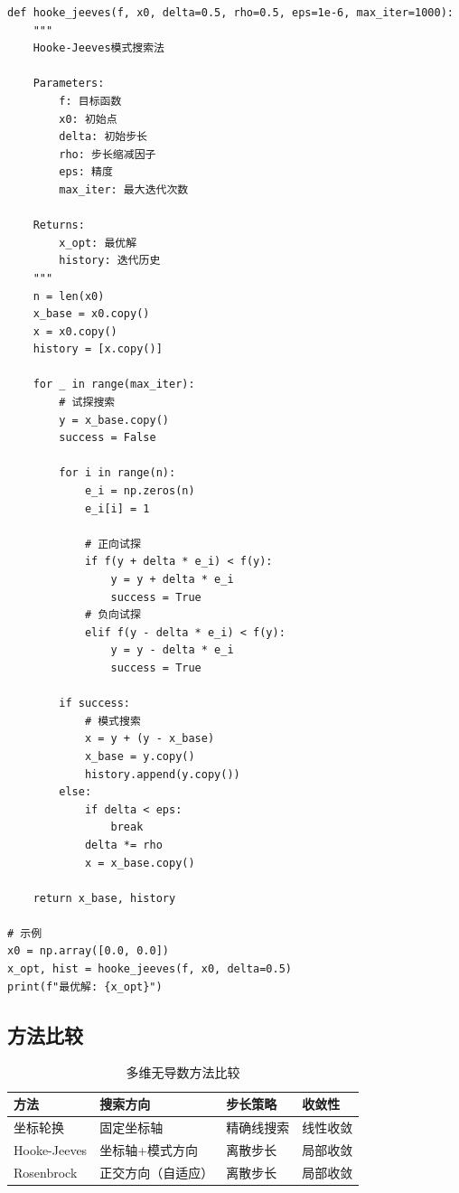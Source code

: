 \begin{codebox}
\begin{lstlisting}
def hooke_jeeves(f, x0, delta=0.5, rho=0.5, eps=1e-6, max_iter=1000):
    """
    Hooke-Jeeves模式搜索法
    
    Parameters:
        f: 目标函数
        x0: 初始点
        delta: 初始步长
        rho: 步长缩减因子
        eps: 精度
        max_iter: 最大迭代次数
    
    Returns:
        x_opt: 最优解
        history: 迭代历史
    """
    n = len(x0)
    x_base = x0.copy()
    x = x0.copy()
    history = [x.copy()]
    
    for _ in range(max_iter):
        # 试探搜索
        y = x_base.copy()
        success = False
        
        for i in range(n):
            e_i = np.zeros(n)
            e_i[i] = 1
            
            # 正向试探
            if f(y + delta * e_i) < f(y):
                y = y + delta * e_i
                success = True
            # 负向试探
            elif f(y - delta * e_i) < f(y):
                y = y - delta * e_i
                success = True
        
        if success:
            # 模式搜索
            x = y + (y - x_base)
            x_base = y.copy()
            history.append(y.copy())
        else:
            if delta < eps:
                break
            delta *= rho
            x = x_base.copy()
    
    return x_base, history

# 示例
x0 = np.array([0.0, 0.0])
x_opt, hist = hooke_jeeves(f, x0, delta=0.5)
print(f"最优解: {x_opt}")
\end{lstlisting}
\end{codebox}

\subsection{方法比较}

\begin{table}[H]
\centering
\caption{多维无导数方法比较}
\begin{tabular}{@{}llll@{}}
\toprule
\textbf{方法} & \textbf{搜索方向} & \textbf{步长策略} & \textbf{收敛性} \\
\midrule
坐标轮换 & 固定坐标轴 & 精确线搜索 & 线性收敛 \\
Hooke-Jeeves & 坐标轴+模式方向 & 离散步长 & 局部收敛 \\
Rosenbrock & 正交方向（自适应） & 离散步长 & 局部收敛 \\
\bottomrule
\end{tabular}
\end{table}

